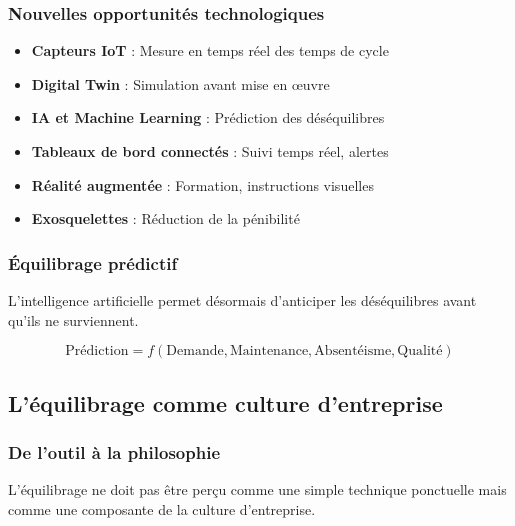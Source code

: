 \documentclass[12pt,a4paper]{article}
\newenvironment{methodbox}[1]
  {\begin{tcolorbox}[colback=blue!5!white, colframe=methodcolor, title=#1]\small}
  {\end{tcolorbox}}
\begin{document}
\begin{center}
\subsubsection{Nouvelles opportunités technologiques}

\begin{methodbox}{Technologies au service de l'équilibrage}
\begin{itemize}
    \item \textbf{Capteurs IoT} : Mesure en temps réel des temps de cycle
    \item \textbf{Digital Twin} : Simulation avant mise en œuvre
    \item \textbf{IA et Machine Learning} : Prédiction des déséquilibres
    \item \textbf{Tableaux de bord connectés} : Suivi temps réel, alertes
    \item \textbf{Réalité augmentée} : Formation, instructions visuelles
    \item \textbf{Exosquelettes} : Réduction de la pénibilité
\end{itemize}
\end{methodbox}

\subsubsection{Équilibrage prédictif}

L'intelligence artificielle permet désormais d'anticiper les déséquilibres avant qu'ils ne surviennent.

\[
\boxed{\text{Prédiction} = f(\text{Demande}, \text{Maintenance}, \text{Absentéisme}, \text{Qualité})}
\]

\subsection{L'équilibrage comme culture d'entreprise}

\subsubsection{De l'outil à la philosophie}

L'équilibrage ne doit pas être perçu comme une simple technique ponctuelle mais comme une composante de la culture d'entreprise.

\begin{center}
\end{center}
\end{center}
\end{document}
